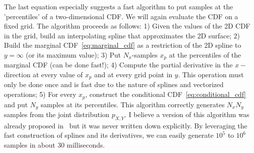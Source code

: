 \documentclass{article}
\begin{document}
The last equation especially suggests a fast algorithm to put samples at the 'percentiles' of a two-dimensional CDF. We will again evaluate the CDF on a fixed grid. The algorithm proceeds as follows: 1) Given the values of the 2D CDF in the grid, build an interpolating spline that approximates the 2D surface; 2) Build the marginal CDF~\eqref{eq:marginal_cdf} as a restriction of the 2D spline to $y = \infty$ (or its maximum value); 3) Put $N_x$-samples $x_p$ at the percentiles of the marginal CDF (can be done fast!); 4) Compute the partial derivative in the $x-$ direction at every value of $x_p$ and at every grid point in $y$. This operation must only be done once and is fast due to the nature of splines and vectorized operations; 5) For every $x_p$, construct the conditional CDF~\eqref{eq:conditional_cdf} and put $N_y$ samples at its percentiles. This algorithm correctly generates $N_x N_y$ samples from the joint distribution $p_{X,Y}$. I believe a version of this algorithm was already proposed in~\cite{zou2005equation} but it was never written down explicitly. By leveraging the fast construction of splines and its derivatives, we can easily generate $10^5$ to $10^6$ samples in about $30$ milliseconds.
\end{document}
